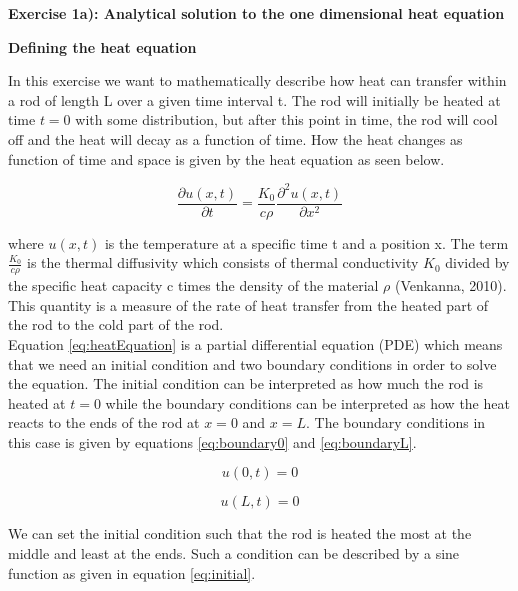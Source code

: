 \documentclass[12pt,a4paper]{article}
\begin{document}
\newpage

\begin{center}
\Large{\textbf{Exercise 1a): Analytical solution to the one dimensional heat equation}}
\end{center}

\begin{center}
\large{\textbf{Defining the heat equation}}
\end{center}

\noindent In this exercise we want to mathematically describe how heat can transfer within a rod of length L over a given time interval t. The rod will initially be heated at time $t = 0$ with some distribution, but after this point in time, the rod will cool off and the heat will decay as a function of time. How the heat changes as function of time and space is given by the heat equation as seen below.

\begin{equation}\label{eq:heatEquation}
\frac{\partial u(x,t)}{\partial t} = \frac{K_0}{c\rho} \frac{\partial^2 u(x,t)}{\partial x^2} 
\end{equation}

\noindent where $u(x,t)$ is the temperature at a specific time t and a position x. The term $\frac{K_0}{c\rho}$ is the thermal diffusivity which consists of thermal conductivity $K_0$ divided by the specific heat capacity c times the density of the material $\rho$ (Venkanna, 2010). This quantity is a measure of the rate of heat transfer from the heated part of the rod to the cold part of the rod. 
\\
Equation \ref{eq:heatEquation} is a partial differential equation (PDE) which means that we need an initial condition and two boundary conditions in order to solve the equation. The initial condition can be interpreted as how much the rod is heated at $t = 0$ while the boundary conditions can be interpreted as how the heat reacts to the ends of the rod at $x = 0$ and $x = L$. The boundary conditions in this case is given by equations \ref{eq:boundary0} and \ref{eq:boundaryL}.

\begin{equation}\label{eq:boundary0}
u(0,t) = 0
\end{equation}

\begin{equation}\label{eq:boundaryL}
u(L,t) = 0
\end{equation}

\noindent We can set the initial condition such that the rod is heated the most at the middle and least at the ends. Such a condition can be described by a sine function as given in equation \ref{eq:initial}.
\end{document}
